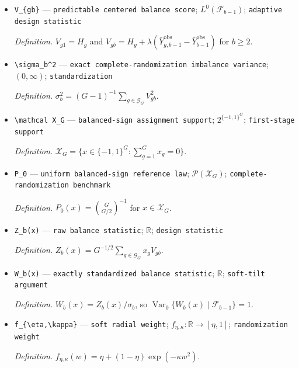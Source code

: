 \documentclass{article}
\begin{document}
\begin{itemize}
  \par\smallskip\noindent\emph{Definition.} \texttt{A prespecified centered group covariate score.}
  \item \texttt{V\_\allowbreak{}\{gb\}\allowbreak{}} --- \texttt{predictable centered balance score}; \(L^0(\mathcal F_{b-1})\); \texttt{adaptive design statistic}
  \par\smallskip\noindent\emph{Definition.} \(V_{g1}=H_g\) and \(V_{gb}=H_g+\lambda(\bar Y^{\mathrm{obs}}_{g,b-1}-\bar Y^{\mathrm{obs}}_{b-1})\) for \(b\geq2\).
  \item \texttt{\textbackslash{}\allowbreak{}sigma\_\allowbreak{}b\textasciicircum{}2} --- \texttt{exact complete-\allowbreak{}randomization imbalance variance}; \((0,\infty)\); \texttt{standardization}
  \par\smallskip\noindent\emph{Definition.} \(\sigma_b^2=(G-1)^{-1}\sum_{g\in\mathcal G_G}V_{gb}^2\).
  \item \texttt{\textbackslash{}\allowbreak{}mathcal X\_\allowbreak{}G} --- \texttt{balanced-\allowbreak{}sign assignment support}; \(2^{\{-1,1\}^G}\); \texttt{first-\allowbreak{}stage support}
  \par\smallskip\noindent\emph{Definition.} \(\mathcal X_G=\{x\in\{-1,1\}^G:\sum_{g=1}^Gx_g=0\}\).
  \item \texttt{P\_\allowbreak{}0} --- \texttt{uniform balanced-\allowbreak{}sign reference law}; \(\mathcal P(\mathcal X_G)\); \texttt{complete-\allowbreak{}randomization benchmark}
  \par\smallskip\noindent\emph{Definition.} \(P_0(x)=\binom{G}{G/2}^{-1}\) for \(x\in\mathcal X_G\).
  \item \texttt{Z\_\allowbreak{}b(x)} --- \texttt{raw balance statistic}; \(\mathbb R\); \texttt{design statistic}
  \par\smallskip\noindent\emph{Definition.} \(Z_b(x)=G^{-1/2}\sum_{g\in\mathcal G_G}x_gV_{gb}\).
  \item \texttt{W\_\allowbreak{}b(x)} --- \texttt{exactly standardized balance statistic}; \(\mathbb R\); \texttt{soft-\allowbreak{}tilt argument}
  \par\smallskip\noindent\emph{Definition.} \(W_b(x)=Z_b(x)/\sigma_b\), so \(\operatorname{Var}_0\{W_b(x)\mid\mathcal F_{b-1}\}=1\).
  \item \texttt{f\_\allowbreak{}\{\textbackslash{}\allowbreak{}eta,\allowbreak{}\textbackslash{}\allowbreak{}kappa\}\allowbreak{}} --- \texttt{soft radial weight}; \(f_{\eta,\kappa}:\mathbb R\to[\eta,1]\); \texttt{randomization weight}
  \par\smallskip\noindent\emph{Definition.} \(f_{\eta,\kappa}(w)=\eta+(1-\eta)\exp(-\kappa w^2)\).

\end{itemize}
\end{document}
